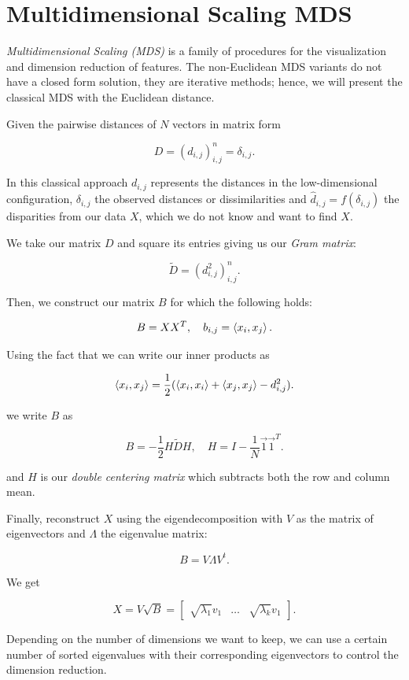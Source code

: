 \section{Multidimensional Scaling MDS}

\emph{Multidimensional Scaling (MDS)} is a family of procedures for the visualization and dimension reduction of features.
The non-Euclidean MDS variants do not have a closed form solution, they are iterative methods; hence, we will present the classical 
MDS with the Euclidean distance.

Given the pairwise distances of \(N\) vectors in matrix form

\[
	D = (d_{i,j})_{i,j}^n = \delta_{i,j}.
\]

In this classical approach \(d_{i,j}\) represents the distances in the low-dimensional configuration, \(\delta_{i,j}\) the observed distances or dissimilarities and
\(\hat{d}_{i,j}= f(\delta_{i,j})\) the disparities from our data \(X\), which we do not know and want to find \(X\).

We take our matrix \(D\) and square its entries giving us our \emph{Gram matrix}:

\[
	\tilde{D} = (d_{i,j}^2)_{i,j}^n.
\]

Then, we construct our matrix \(B\) for which the following holds:

\[
	B = X X^T, \quad b_{i, j} = \left\langle x_i, x_j\right\rangle.
\]

Using the fact that we can write our inner products as

\[
	\left\langle x_i, x_j\right\rangle = \frac{1}{2} (\left\langle x_i, x_i\right\rangle + \left\langle x_j, x_j\right\rangle - d_{i, j}^2).
\]

we write \(B\) as

\[
	B = - \frac{1}{2} H \tilde{D} H, \quad H = I - \frac{1}{N} \vec{1} \vec{1}^T.
\]

and \(H\) is our \emph{double centering matrix} which subtracts both the row and column mean.

Finally, reconstruct \(X\) using the eigendecomposition with \(V\) as the matrix of eigenvectors and \(\Lambda\) the eigenvalue matrix:

\[
	B = V \Lambda V^t.
\]

We get

\[
	X = V \sqrt{B} =
	\begin{bmatrix}
		\sqrt{\lambda_1} v_1 & \dots & \sqrt{\lambda_k} v_1
	\end{bmatrix}.
\]

Depending on the number of dimensions we want to keep, we can use a certain number of sorted eigenvalues with their corresponding
eigenvectors to control the dimension reduction.

